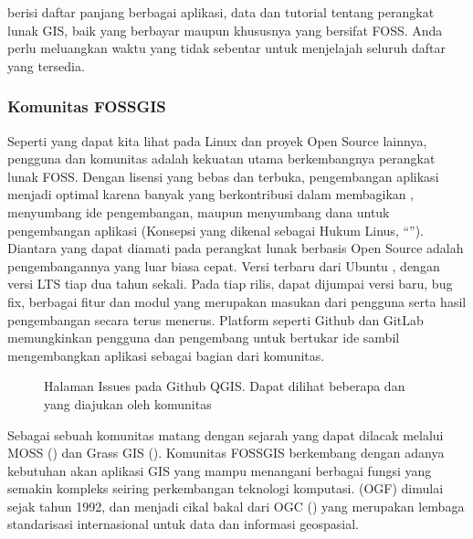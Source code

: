 \documentclass[letterpaper,10pt,english]{sphinxmanual}
\let\sphinxpxdimen\pdfpxdimen\else\newdimen\sphinxpxdimen
\begin{document}
 berisi daftar panjang berbagai aplikasi, data dan tutorial tentang perangkat lunak GIS, baik yang berbayar maupun khususnya yang bersifat FOSS. Anda perlu meluangkan waktu yang tidak sebentar untuk menjelajah seluruh daftar yang tersedia.


\subsubsection{Komunitas FOSS\sphinxhyphen{}GIS}
\label{\detokenize{sesi1/fossgis:komunitas-foss-gis}}
Seperti yang dapat kita lihat pada Linux dan proyek Open Source lainnya, pengguna dan komunitas adalah kekuatan utama berkembangnya perangkat lunak FOSS. Dengan lisensi yang bebas dan terbuka, pengembangan aplikasi menjadi optimal karena banyak yang berkontribusi dalam membagikan , menyumbang ide pengembangan, maupun menyumbang dana untuk pengembangan aplikasi (Konsepsi yang dikenal sebagai Hukum Linus, “”). Diantara yang dapat diamati pada perangkat lunak berbasis Open Source adalah pengembangannya yang luar biasa cepat. Versi terbaru dari Ubuntu , dengan versi LTS tiap dua tahun sekali. Pada tiap rilis, dapat dijumpai versi baru, bug fix, berbagai fitur dan modul yang merupakan masukan dari pengguna serta hasil pengembangan secara terus menerus. Platform seperti Github dan GitLab memungkinkan pengguna dan pengembang untuk bertukar ide sambil mengembangkan aplikasi sebagai bagian dari komunitas.

\begin{figure}[htbp]
\centering
\capstart

\noindent\sphinxincludegraphics[height=550\sphinxpxdimen]{{2020-12-07-17-26-53}.png}
\caption{Halaman Issues pada Github QGIS. Dapat dilihat beberapa  dan  yang diajukan oleh komunitas}\label{\detokenize{sesi1/fossgis:qgisissue}}\end{figure}

Sebagai sebuah komunitas matang dengan sejarah yang dapat dilacak  melalui MOSS () dan Grass GIS (). Komunitas FOSS\sphinxhyphen{}GIS berkembang dengan adanya kebutuhan akan aplikasi GIS yang mampu menangani berbagai fungsi yang semakin kompleks seiring perkembangan teknologi komputasi.  (OGF) dimulai sejak tahun 1992, dan menjadi cikal bakal dari OGC () yang merupakan lembaga standarisasi internasional untuk data dan informasi geospasial.
\end{document}

